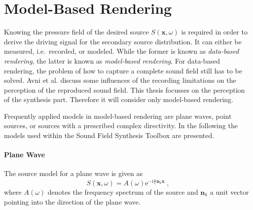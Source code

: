 \documentclass[a4paper]{book}
\newcommand{\reproduce}[1]{%
    \href{#1}{\color{link}\large\Pointinghand}%
}%
\newcommand{\ft}{\footnotesize}                                   %
\newcommand{\I}{\mathrm{i}}                          %
\newcommand{\E}{\mathrm{e}}                          %
\renewcommand{\vec}[1]{\mathbf{#1}}                  %
\newcommand{\x}{\vec{x}}                             %
\newcommand{\n}{\vec{n}}                             %
\newcommand{\omegac}{\frac{\omega}{c}}               %
\newcommand{\qc}{\;,}                                             %
\newcommand\eqlabel[2][]{%
  \label{eq:#2}%
}
\begin{document}
{\newpage

\section{Model-Based Rendering}
\label{sec:model_based_rendering}
%
Knowing the pressure field of the desired source $S(\x,\omega)$ is required
in order to derive the driving signal for the secondary source distribution.
It can either be measured, i.e.~recorded, or modeled. While the former is known as
{\em data-based rendering},
the latter is known as {\em model-based rendering}.
For data-based rendering, the problem of how to capture a complete sound field
still has to be solved. Avni et al. discuss some influences of the
recording limitations on the perception of the reproduced sound field.\cite{Avni2013}
This thesis focusses on the perception of the synthesis part. Therefore it
will consider only model-based rendering.

Frequently applied models in model-based rendering are plane waves, point
sources, or sources with a prescribed complex directivity.
In the following the models used within the Sound Field Synthesis
Toolbox are presented.
%
\paragraph{Plane Wave}
\label{sec:plane_wave}
%
The source model for a plane wave is given
as\cite[][p.\,21, (2.24). Williams defines the Fourier transform with transposed
signs as $F(\omega) = \int f(t) \E^{\I\omega t}$. This leads also to changed signs
in his definitions of the Green's functions and field expansions.]{Williams1999}
%
%    
%
\begin{equation} 
    S(\x,\omega) = A(\omega) \E^{-\I\omegac \n_k \x}
    \qc
    \eqlabel{S:pw}
\end{equation}
%
where $A(\omega)$ denotes the frequency spectrum of the source
and $\n_k$ a unit vector pointing into the direction of
the plane wave.

}
\end{document}
